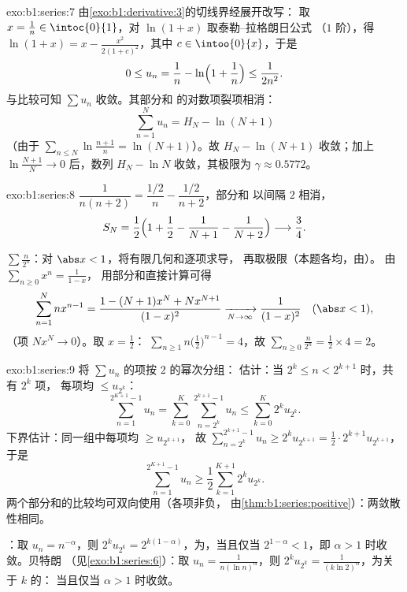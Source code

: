 \begin{solution}{exo:b1:series:7}
由\cref{exo:b1:derivative:3}的切线界经展开改写：
取 $x = \frac1n \in \intoc{0}{1}$，对 $\ln(1+x)$ 取泰勒–拉格朗日公式
（$1$ 阶），得 $\ln(1 + x) = x - \frac{x^2}{2(1 +
c)^2}$，其中 $c \in \intoo{0}{x}$，于是
\[
0 \leq u_n = \frac1n - \ln\Bigl(1 + \frac1n\Bigr) \leq
\frac{1}{2n^2} .
\]
与比较可知 $\sum u_n$ 收敛。其部分和
的对数项裂项相消：
\[
\sum_{n=1}^{N} u_n = H_N - \ln(N+1)
\]
（由于 $\sum_{n\leq N} \ln\frac{n+1}{n} = \ln(N+1)$）。故 $H_N -
\ln(N+1)$ 收敛；加上 $\ln\frac{N+1}{N} \to 0$ 后，数列
$H_N - \ln N$ 收敛，其极限为 $\gamma \approx 0.5772$。
\end{solution}

\begin{solution}{exo:b1:series:8}
$\dfrac{1}{n(n+2)} = \dfrac{1/2}{n} - \dfrac{1/2}{n+2}$，部分和
以间隔 $2$ 相消，
\[
S_N = \frac12\Bigl(1 + \frac12 - \frac{1}{N+1} -
\frac{1}{N+2}\Bigr) \longrightarrow \frac34 .
\]

$\sum \frac{n}{2^n}$：对 $\abs x < 1$，将有限几何和逐项求导，
再取极限（本题各均，由）。
由 $\sum_{n\geq0} x^n = \frac{1}{1-x}$，
用部分和直接计算可得
\[
\sum_{n=1}^{N} n x^{n-1}
= \frac{1 - (N+1)x^N + N x^{N+1}}{(1 - x)^2}
\xrightarrow[N\to\infty]{} \frac{1}{(1-x)^2}
\quad (\abs x < 1),
\]
（项 $N x^N \to 0$）。取 $x = \frac12$：
$\sum_{n\geq1} n\bigl(\frac12\bigr)^{n-1} = 4$，故 $\sum_{n\geq0}
\frac{n}{2^n} = \frac12 \times 4 = 2$。
\end{solution}

\begin{solution}{exo:b1:series:9}
将 $\sum u_n$ 的项按 $2$ 的幂次分组：
估计：当 $2^k \leq n < 2^{k+1}$ 时，共有 $2^k$ 项，
每项均 $\leq u_{2^k}$：
\[
\sum_{n=1}^{2^{K+1}-1} u_n
= \sum_{k=0}^{K} \sum_{n=2^k}^{2^{k+1}-1} u_n
\leq \sum_{k=0}^{K} 2^k u_{2^k} .
\]
下界估计：同一组中每项均 $\geq u_{2^{k+1}}$，
故 $\sum_{n=2^k}^{2^{k+1}-1} u_n \geq 2^k u_{2^{k+1}} = \frac12
\cdot 2^{k+1} u_{2^{k+1}}$，于是
\[
\sum_{n=1}^{2^{K+1}-1} u_n \geq \frac12 \sum_{k=1}^{K+1} 2^{k}
u_{2^{k}} .
\]
两个部分和的比较均可双向使用（各项非负，
由\cref{thm:b1:series:positive}）：两敛散性相同。

：取 $u_n = n^{-\alpha}$，则 $2^k u_{2^k} =
2^{k(1-\alpha)}$，为，当且仅当 $2^{1 - \alpha}
< 1$，即 $\alpha > 1$ 时收敛。贝特朗
（见\cref{exo:b1:series:6}）：取 $u_n = \frac{1}{n(\ln n)^\alpha}$，则
$2^k u_{2^k} = \frac{1}{(k\ln 2)^\alpha}$，为关于 $k$ 的：
当且仅当 $\alpha > 1$ 时收敛。
\end{solution}

